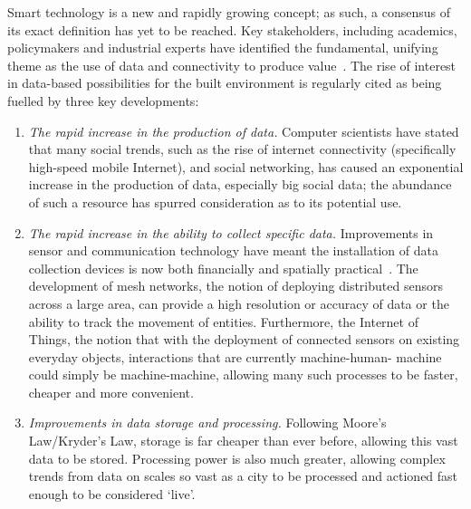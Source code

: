 \documentclass[journal]{IEEEtran}
\begin{document}
Smart technology is a new and rapidly growing concept; as such, a
consensus of its exact definition has yet to be reached. Key
stakeholders, including academics, policymakers and industrial experts
have identified the fundamental, unifying theme as the use of data and
connectivity to produce
value~\cite{komninos:2002,arup-et-al:2011,harrison+abbottdonnelly:2011,batty-et-al:2012,buscher:2014}.
The rise of interest in data-based possibilities for the built
environment is regularly cited as being fuelled by three key
developments:

\begin{enumerate}
\item {\emph{The rapid increase in the production of data.}}
Computer scientists have stated that many social trends, such as the
rise of internet connectivity (specifically high-speed mobile
Internet), and social networking, has caused an exponential increase
in the production of data, especially big social data; the
abundance of such a resource has spurred consideration as to its
potential use.
\item {\emph{The rapid increase in the ability to collect specific
data.}} Improvements in sensor and communication technology have meant
the installation of data collection devices is now both financially
and spatially practical~\cite{townsend:2013}. The development of mesh
networks, the notion of deploying distributed sensors across a large
area, can provide a high resolution or accuracy of data or the ability
to track the movement of entities. Furthermore, the Internet of
Things, the notion that with the deployment of connected sensors on
existing everyday objects, interactions that are currently
machine-human- machine could simply be machine-machine, allowing many
such processes to be faster, cheaper and more convenient.
\item {\emph{Improvements in data storage and processing.}}
Following Moore's Law/Kryder's Law, storage is far cheaper than ever
before, allowing this vast data to be stored. Processing power is also
much greater, allowing complex trends from data on scales so vast as a
city to be processed and actioned fast enough to be considered `live'.
\end{enumerate}
\end{document}
